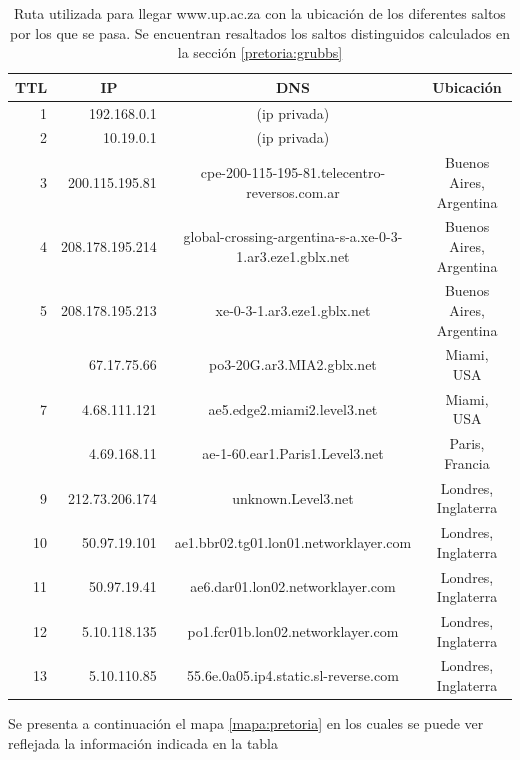 \begin{table}[H]
    \begin{center}
        \begin{tabular}{| r | r | c | c |}
  \hline
  {\bf TTL} & \multicolumn{1}{|c|}{\bf IP} & {\bf DNS} & {\bf Ubicación}\\
  \hline
\hline 1  & 192.168.0.1 & (ip privada) & \\
\hline 2  & 10.19.0.1 & (ip privada) & \\
\hline 3  & 200.115.195.81 & cpe-200-115-195-81.telecentro-reversos.com.ar & Buenos Aires, Argentina\\
\hline 4  & 208.178.195.214 & global-crossing-argentina-s-a.xe-0-3-1.ar3.eze1.gblx.net & Buenos Aires, Argentina\\ 
\hline 5  & 208.178.195.213 & xe-0-3-1.ar3.eze1.gblx.net & Buenos Aires, Argentina\\ 
\rowcolor{blue!25}\hline 6  & 67.17.75.66 &  po3-20G.ar3.MIA2.gblx.net & Miami, USA\\ 
\hline 7  & 4.68.111.121 &  ae5.edge2.miami2.level3.net  & Miami, USA\\ 
\rowcolor{blue!25}\hline 8  & 4.69.168.11 & ae-1-60.ear1.Paris1.Level3.net & Paris, Francia\\ 
\hline 9  & 212.73.206.174 & unknown.Level3.net & Londres, Inglaterra\\ 
\hline 10  & 50.97.19.101 & ae1.bbr02.tg01.lon01.networklayer.com & Londres, Inglaterra\\ 
\hline 11  & 50.97.19.41 & ae6.dar01.lon02.networklayer.com & Londres, Inglaterra\\ 
\hline 12  & 5.10.118.135 & po1.fcr01b.lon02.networklayer.com & Londres, Inglaterra\\ 
\hline 13  & 5.10.110.85 &  55.6e.0a05.ip4.static.sl-reverse.com & Londres, Inglaterra\\ 
\hline
        \end{tabular}
        \caption{Ruta utilizada para llegar www.up.ac.za con la ubicación de los diferentes saltos por los que se pasa. Se encuentran resaltados los saltos distinguidos calculados en la sección \ref{pretoria:grubbs}}
        \label{table:pretoria} 
    \end{center}
\end{table}

Se presenta a continuación el mapa \ref{mapa:pretoria} en los cuales se puede ver reflejada la información indicada en la tabla \label{table:pretoria}

